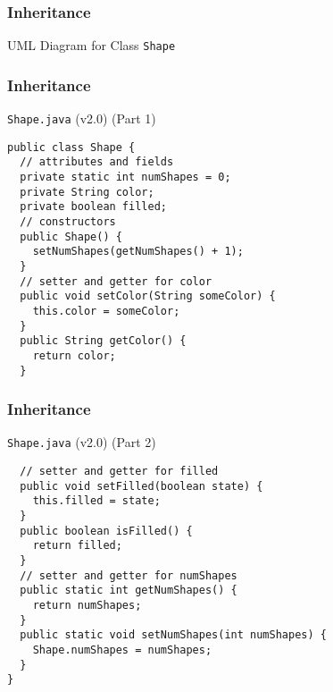 \documentclass[10pt, compress]{beamer}
\begin{document}
\begin{frame}[fragile]
  \frametitle{Inheritance}
  \begin{block}{UML Diagram for Class \texttt{Shape}}
  \begin{figure}
  \centering
  \end{figure}
  \end{block}
\end{frame}

\begin{frame}[fragile]
  \frametitle{Inheritance}
  \begin{block}{\texttt{Shape.java} (v2.0) (Part 1)}
    \begin{verbatim}
public class Shape {
  // attributes and fields
  private static int numShapes = 0;
  private String color;
  private boolean filled;
  // constructors
  public Shape() {
    setNumShapes(getNumShapes() + 1);
  }
  // setter and getter for color
  public void setColor(String someColor) {
    this.color = someColor;
  }
  public String getColor() {
    return color;
  }
    \end{verbatim}
  \end{block}
\end{frame}

\begin{frame}[fragile]
  \frametitle{Inheritance}
  \begin{block}{\texttt{Shape.java} (v2.0) (Part 2)}
    \begin{verbatim}
  // setter and getter for filled
  public void setFilled(boolean state) {
    this.filled = state;
  }
  public boolean isFilled() {
    return filled;
  }
  // setter and getter for numShapes
  public static int getNumShapes() {
    return numShapes;
  }
  public static void setNumShapes(int numShapes) {
    Shape.numShapes = numShapes;
  }
}
    \end{verbatim}
  \end{block}
\end{frame}
\end{document}
